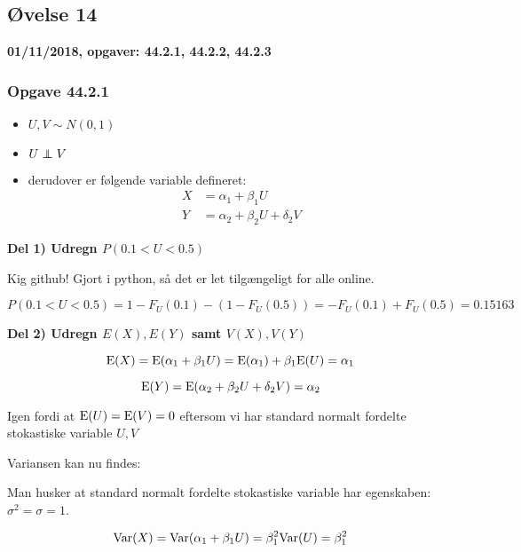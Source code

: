 \horizline

\subsection{Øvelse 14}

\textbf{01/11/2018, opgaver: 44.2.1, 44.2.2, 44.2.3}

\subsubsection{Opgave 44.2.1}

\begin{itemize}
    \item $U, V \sim N(0,1)$
    \item $U \independent V$
    \item derudover er følgende variable defineret:
    \begin{align}
        X &= \alpha_1 + \beta_1 U \\
        Y &= \alpha_2 + \beta_2 U + \delta_2  V
    \end{align}
\end{itemize}

\textbf{Del 1) Udregn $P(0.1 < U <0.5)$}

Kig github! Gjort i python, så det er let tilgængeligt for alle online.

\begin{equation}
    P(0.1 < U <0.5) = 1 - F_U(0.1) - (1- F_U(0.5)) = - F_U(0.1) + F_U(0.5) = 0.15163
\end{equation}

\textbf{Del 2) Udregn $E(X), E(Y)$ samt $V(X), V(Y)$}

\begin{equation}
    \text{E}(X) = \text{E}(\alpha_1 + \beta_1 U) = \text{E}(\alpha_1) + \beta_1 \text{E}(U) = \alpha_1 
\end{equation}

\begin{equation}
    \text{E}(Y) = \text{E}(\alpha_2 + \beta_2 U + \delta_2 V) = \alpha_2
\end{equation}

Igen fordi at $\text{E}(U) = \text{E}(V) = 0$ eftersom vi har standard normalt fordelte stokastiske variable $U, V$

Variansen kan nu findes:

Man husker at standard normalt fordelte stokastiske variable har egenskaben: $\sigma^2 = \sigma = 1$.

\begin{equation}
    \text{Var}(X) = \text{Var}(\alpha_1 + \beta_1 U) = \beta_1^2 \text{Var}(U) = \beta_1^2 
\end{equation}

